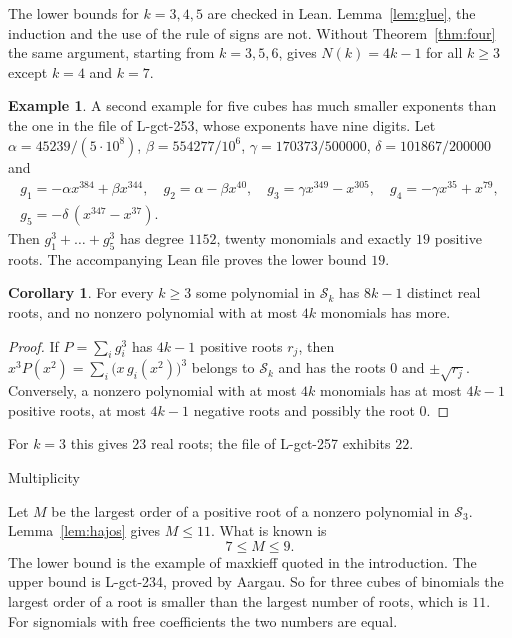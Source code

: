 \documentclass[10pt,a4paper]{article}
\makeatletter
\renewcommand\section{\@startsection{section}{1}{\z@}{1.7em plus .3em minus .2em}{0.25em}%
  {\normalfont\bfseries\fontsize{13.5}{17}\selectfont\raggedright}}
\theoremstyle{definition}
\newtheorem{corollary}[theorem]{Corollary}
\newtheorem{example}[theorem]{Example}
\newcommand{\row}[1]{L-gct-#1}
\makeatother
\begin{document}
The lower bounds for $k=3,4,5$ are checked in Lean. Lemma~\ref{lem:glue}, the induction and the use of the rule of
signs are not. Without Theorem~\ref{thm:four} the same argument, starting from $k=3,5,6$, gives $N(k)=4k-1$ for all
$k\ge3$ except $k=4$ and $k=7$.

\begin{example}\label{ex:five}
A second example for five cubes has much smaller exponents than the one in the file of \row{253}, whose exponents
have nine digits. Let $\alpha=45239/(5\cdot10^{8})$, $\beta=554277/10^{6}$, $\gamma=170373/500000$,
$\delta=101867/200000$ and
\begin{gather*}
g_1=-\alpha x^{384}+\beta x^{344},\quad g_2=\alpha-\beta x^{40},\quad g_3=\gamma x^{349}-x^{305},\quad
g_4=-\gamma x^{35}+x^{79},\\ g_5=-\delta\,(x^{347}-x^{37}).
\end{gather*}
Then $g_1^3+\dots+g_5^3$ has degree $1152$, twenty monomials and exactly $19$ positive roots. The accompanying
Lean file proves the lower bound $19$.
\end{example}

\begin{corollary}\label{cor:real}
For every $k\ge3$ some polynomial in $\mathcal{S}_k$ has $8k-1$ distinct real roots, and no nonzero polynomial with
at most $4k$ monomials has more.
\end{corollary}
\begin{proof}
If $P=\sum_ig_i^3$ has $4k-1$ positive roots $r_j$, then $x^3P(x^2)=\sum_i\bigl(x\,g_i(x^2)\bigr)^3$ belongs to
$\mathcal{S}_k$ and has the roots $0$ and $\pm\sqrt{r_j}$. Conversely, a nonzero polynomial with at most $4k$
monomials has at most $4k-1$ positive roots, at most $4k-1$ negative roots and possibly the root $0$.
\end{proof}

For $k=3$ this gives $23$ real roots; the file of \row{257} exhibits $22$.

\section{Multiplicity}\label{sec:mult}

Let $M$ be the largest order of a positive root of a nonzero polynomial in $\mathcal{S}_3$. Lemma~\ref{lem:hajos}
gives $M\le11$. What is known is
\[
7\le M\le9 .
\]
The lower bound is the example of maxkieff quoted in the introduction. The upper bound is \row{234}, proved by
Aargau. So for three cubes of binomials the largest order of a root is smaller than the largest number of roots,
which is $11$. For signomials with free coefficients the two numbers are equal.
\end{document}

